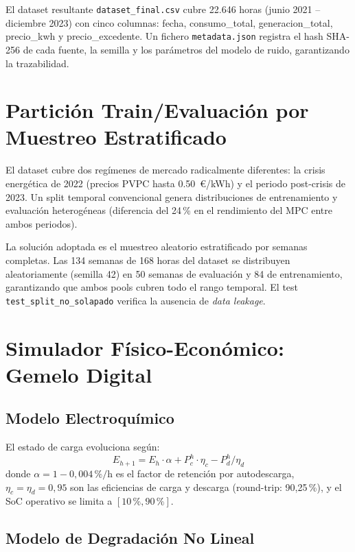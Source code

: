 \documentclass[12pt, a4paper, twoside]{report}
\begin{document}
El dataset resultante \texttt{dataset\_final.csv} cubre 22.646 horas (junio
2021 -- diciembre 2023) con cinco columnas: fecha, consumo\_total,
generacion\_total, precio\_kwh y precio\_excedente. Un fichero
\texttt{metadata.json} registra el hash SHA-256 de cada fuente, la semilla y
los parámetros del modelo de ruido, garantizando la trazabilidad.

\section{Partición Train/Evaluación por Muestreo Estratificado}

El dataset cubre dos regímenes de mercado radicalmente diferentes: la crisis
energética de 2022 (precios PVPC hasta \SI{0,50}{€/kWh}) y el periodo
post-crisis de 2023. Un split temporal convencional genera distribuciones de
entrenamiento y evaluación heterogéneas (diferencia del 24\,\% en el
rendimiento del MPC entre ambos periodos).

La solución adoptada es el muestreo aleatorio estratificado por semanas
completas. Las 134 semanas de 168 horas del dataset se distribuyen
aleatoriamente (semilla 42) en 50 semanas de evaluación y 84 de entrenamiento,
garantizando que ambos pools cubren todo el rango temporal. El test
\texttt{test\_split\_no\_solapado} verifica la ausencia de \textit{data leakage}.

\section{Simulador Físico-Económico: Gemelo Digital}
\label{sec:simulador}

\subsection{Modelo Electroquímico}

El estado de carga evoluciona según:
\begin{equation}
  E_{h+1} = E_h \cdot \alpha + P_c^h \cdot \eta_c - P_d^h / \eta_d
  \label{eq:balance}
\end{equation}
donde $\alpha = 1 - 0{,}004\,\%/\text{h}$ es el factor de retención por
autodescarga, $\eta_c = \eta_d = 0{,}95$ son las eficiencias de carga y
descarga (round-trip: 90{,}25\,\%), y el SoC operativo se limita a
$[10\,\%, 90\,\%]$.

\subsection{Modelo de Degradación No Lineal}
\end{document}
